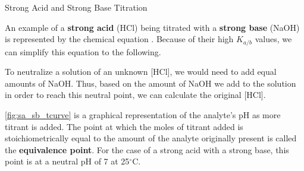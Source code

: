 \documentclass[10pt]{article}
\begin{document}
  \begin{core}{Strong Acid and Strong Base Titration}

    An example of a \textbf{strong acid} (HCl) being titrated with a \textbf{strong base} (NaOH) is represented by the chemical equation . Because of their high $K_{a/b}$ values, we can simplify this equation to the following.


    To neutralize a solution of an unknown [HCl], we would need to add equal amounts of NaOH. Thus, based on the amount of NaOH we add to the solution in order to reach this neutral point, we can calculate the original [HCl].


    \autoref{fig:sa_sb_tcurve} is a graphical representation of the analyte's pH as more titrant is added. The point at which the moles of titrant added is stoichiometrically equal to the amount of the analyte originally present is called the \textbf{equivalence point}. For the case of a strong acid with a strong base, this point is at a neutral pH of 7 at 25$^\circ$C.

  \end{core}
\end{document}
